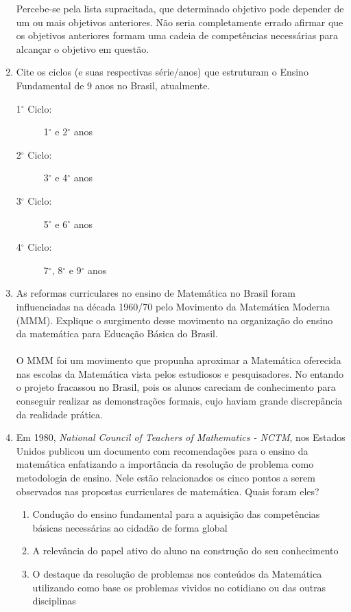 \documentclass[a4paper, 12pt]{article}
\begin{document}
\begin{enumerate}
\begin{itemize}
  \end{itemize}
  Percebe-se pela lista supracitada, que determinado objetivo pode depender de um ou mais objetivos anteriores. Não seria completamente errado afirmar que os objetivos anteriores formam uma cadeia de competências necessárias para alcançar o objetivo em questão.
\item Cite os ciclos (e suas respectivas série/anos) que estruturam o Ensino Fundamental de 9 anos no Brasil, atualmente.
  \begin{description}
  \item[1$^{\circ}$ Ciclo:] 1$^{\circ}$ e 2$^{\circ}$ anos
  \item[2$^{\circ}$ Ciclo:] 3$^{\circ}$ e 4$^{\circ}$ anos
  \item[3$^{\circ}$ Ciclo:] 5$^{\circ}$ e 6$^{\circ}$ anos
  \item[4$^{\circ}$ Ciclo:] 7$^{\circ}$, 8$^{\circ}$ e 9$^{\circ}$ anos
  \end{description}
\item As reformas curriculares no ensino de Matemática no Brasil foram influenciadas na década 1960/70 pelo Movimento da Matemática Moderna (MMM). Explique o surgimento desse movimento na organização do ensino da matemática para Educação Básica do Brasil. \\ \\
 O MMM foi um movimento que propunha aproximar a Matemática oferecida nas escolas da Matemática vista pelos estudiosos e pesquisadores. No entando o projeto fracassou no Brasil, pois os alunos careciam de conhecimento para conseguir realizar as demonstrações formais, cujo haviam grande discrepância da realidade prática.
\item Em 1980, \textit{National Council of Teachers of Mathematics - NCTM}, nos Estados Unidos publicou um documento com recomendações para o ensino da matemática enfatizando a importância da resolução de problema como metodologia de ensino. Nele estão relacionados os cinco pontos a serem observados nas propostas curriculares de matemática. Quais foram eles?
  \begin{enumerate}
  \item Condução do ensino fundamental para a aquisição das competências básicas necessárias ao cidadão de forma global
  \item A relevância do papel ativo do aluno na construção do seu conhecimento
  \item O destaque da resolução de problemas nos conteúdos da Matemática utilizando como base os problemas vividos no cotidiano ou das outras disciplinas

\end{enumerate}
\end{enumerate}
\end{document}
